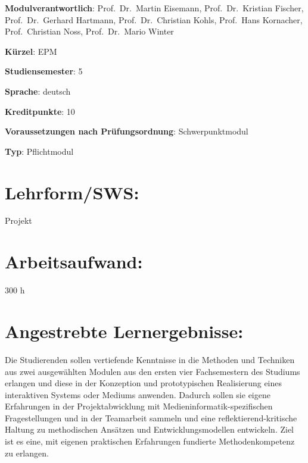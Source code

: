 \begin{modulHead}
\textbf{Modulverantwortlich}: Prof.~Dr.~Martin
Eisemann, Prof.~Dr.~Kristian Fischer, Prof.~Dr.~Gerhard Hartmann,
Prof.~Dr.~Christian Kohls, Prof.~Hans Kornacher, Prof.~Christian Noss,
Prof.~Dr.~Mario
Winter
\end{modulHead}
\begin{modulHead}
\textbf{Kürzel}:
EPM
\end{modulHead}
\begin{modulHead}
\textbf{Studiensemester}:
5
\end{modulHead}
\begin{modulHead}
\textbf{Sprache}:
deutsch
\end{modulHead}
\begin{modulHead}
\textbf{Kreditpunkte}:
10
\end{modulHead}
\begin{modulHead}
\textbf{Voraussetzungen nach
Prüfungsordnung}:
Schwerpunktmodul
\end{modulHead}
\begin{modulHead}
\textbf{Typ}:
Pflichtmodul
\end{modulHead}


\section*{Lehrform/SWS:}\label{lehrformsws-10}

Projekt

\section*{Arbeitsaufwand:}\label{arbeitsaufwand-10}

300 h

\section*{Angestrebte
Lernergebnisse:}\label{angestrebte-lernergebnisse-10}

Die Studierenden sollen vertiefende Kenntnisse in die Methoden und
Techniken aus zwei ausgewählten Modulen aus den ersten vier
Fachsemestern des Studiums erlangen und diese in der Konzeption und
prototypischen Realisierung eines interaktiven Systems oder Mediums
anwenden. Dadurch sollen sie eigene Erfahrungen in der Projektabwicklung
mit Medieninformatik-spezifischen Fragestellungen und in der Teamarbeit
sammeln und eine reflektierend-kritische Haltung zu methodischen
Ansätzen und Entwicklungsmodellen entwickeln. Ziel ist es eine, mit
eigenen praktischen Erfahrungen fundierte Methodenkompetenz zu erlangen.

